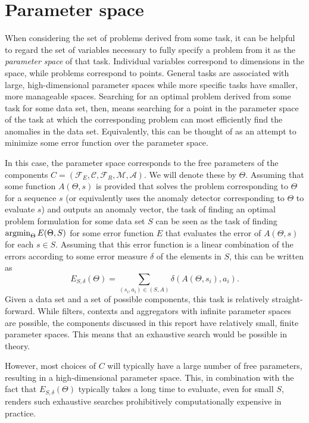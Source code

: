 \section{Parameter space}

When considering the set of problems derived from some task, it can be helpful to regard the set of variables necessary to fully specify a problem from it as the \emph{parameter space} of that task. Individual variables correspond to dimensions in the space, while problems correspond to points. General tasks are associated with large, high-dimensional parameter spaces while more specific tasks have smaller, more manageable spaces.  Searching for an optimal problem derived from some task for some data set, then, means searching for a point in the parameter space of the task at which the corresponding problem can most efficiently find the anomalies in the data set. Equivalently, this can be thought of as an attempt to minimize some error function over the parameter space. 

In this case, the parameter space corresponds to the free parameters of the components $C = (\mathcal{F}_E, \mathcal{C}, \mathcal{F}_R, \mathcal{M},\mathcal{A})$. We will denote these by $\Theta$. Assuming that some function $A(\Theta, s)$ is provided that solves the problem corresponding to $\Theta$ for a sequence $s$ (or equivalently uses the anomaly detector corresponding to $\Theta$ to evaluate $s$) and outputs an anomaly vector, the task of finding an optimal problem formulation for some data set $S$ can be seen as the task of finding $\argmin_\Theta E(\Theta, S)$ for some error function $E$ that evaluates the error of $A(\Theta, s)$ for each $s \in S$. Assuming that this error function is a linear combination of the errors according to some error measure $\delta$ of the elements in $S$, this can be written as
\[
    E_{S, \delta}(\Theta) = \sum_{(s_i, a_i) \in (S, A)} \delta(A(\Theta, s_i), a_i).
\]
Given a data set and a set of possible components, this task is relatively straight-forward. While filters, contexts and aggregators with infinite parameter spaces are possible, the components discussed in this report have relatively small, finite parameter spaces. This means that an exhaustive search would be possible in theory.

However, most choices of $C$ will typically have a large number of free parameters, resulting in a high-dimensional parameter space. This, in combination with the fact that $E_{S, \delta}(\Theta)$ typically takes a long time to evaluate, even for small $S$, renders such exhaustive searches prohibitively computationally expensive in practice.

